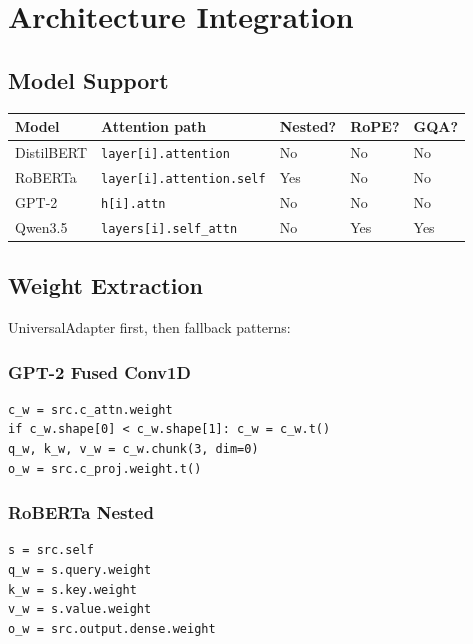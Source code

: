 \section{Architecture Integration}

\subsection{Model Support}

\begin{table}[H]
\centering
\small
\begin{tabular}{lllll}
\toprule
\textbf{Model} & \textbf{Attention path} & \textbf{Nested?} & \textbf{RoPE?} & \textbf{GQA?} \\
\midrule
DistilBERT & \texttt{layer[i].attention} & No & No & No \\
RoBERTa & \texttt{layer[i].attention.self} & Yes & No & No \\
GPT-2 & \texttt{h[i].attn} & No & No & No \\
Qwen3.5 & \texttt{layers[i].self\_attn} & No & Yes & Yes \\
\bottomrule
\end{tabular}
\end{table}

\subsection{Weight Extraction}

UniversalAdapter first, then fallback patterns:

\subsubsection{GPT-2 Fused Conv1D}

\begin{lstlisting}
c_w = src.c_attn.weight
if c_w.shape[0] < c_w.shape[1]: c_w = c_w.t()
q_w, k_w, v_w = c_w.chunk(3, dim=0)
o_w = src.c_proj.weight.t()
\end{lstlisting}

\subsubsection{RoBERTa Nested}

\begin{lstlisting}
s = src.self
q_w = s.query.weight
k_w = s.key.weight
v_w = s.value.weight
o_w = src.output.dense.weight
\end{lstlisting}

